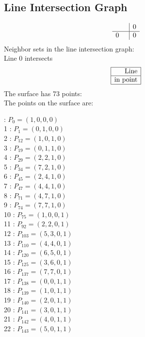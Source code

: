 \documentclass{article}
\begin{document}
{\subsection*{Line Intersection Graph}
{\arraycolsep=1pt
$$
\begin{array}{rr|*{1}r}
 &  & 0\\
\hline
0 &  & 0\\
\end{array}
$$
}%
Neighbor sets in the line intersection graph:\\
Line 0 intersects 
$$
\begin{array}{|r*{0}{|c}|}
\hline
\mbox{Line} \\
\hline
\mbox{in point} \\
\hline
\end{array}
$$
The surface has 73 points:\\
The points on the surface are:\\
\begin{multicols}{3}
 : $P_{0}=( 1, 0, 0, 0 )$\\
1 : $P_{1}=( 0, 1, 0, 0 )$\\
2 : $P_{12}=( 1, 0, 1, 0 )$\\
3 : $P_{19}=( 0, 1, 1, 0 )$\\
4 : $P_{29}=( 2, 2, 1, 0 )$\\
5 : $P_{34}=( 7, 2, 1, 0 )$\\
6 : $P_{45}=( 2, 4, 1, 0 )$\\
7 : $P_{47}=( 4, 4, 1, 0 )$\\
8 : $P_{71}=( 4, 7, 1, 0 )$\\
9 : $P_{74}=( 7, 7, 1, 0 )$\\
10 : $P_{75}=( 1, 0, 0, 1 )$\\
11 : $P_{92}=( 2, 2, 0, 1 )$\\
12 : $P_{103}=( 5, 3, 0, 1 )$\\
13 : $P_{110}=( 4, 4, 0, 1 )$\\
14 : $P_{120}=( 6, 5, 0, 1 )$\\
15 : $P_{125}=( 3, 6, 0, 1 )$\\
16 : $P_{137}=( 7, 7, 0, 1 )$\\
17 : $P_{138}=( 0, 0, 1, 1 )$\\
18 : $P_{139}=( 1, 0, 1, 1 )$\\
19 : $P_{140}=( 2, 0, 1, 1 )$\\
20 : $P_{141}=( 3, 0, 1, 1 )$\\
21 : $P_{142}=( 4, 0, 1, 1 )$\\
22 : $P_{143}=( 5, 0, 1, 1 )$\\

\end{multicols}}
\end{document}
